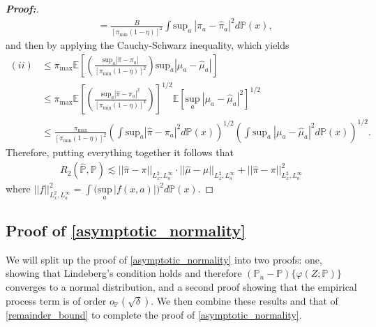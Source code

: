 \documentclass[11pt,twoside]{article}
\theoremstyle{definition}
\theoremstyle{remark}
\begin{document}
\begin{proof}[\textbf{Proof:}]
\begin{align*}
    &= \frac{B}{[\pi_{\min}(1-\eta)]^2}  \int  \text{sup}_a \  | \pi_a - \widehat{\pi}_a |^2  d \mathbb{P}(x),
\end{align*}
and then by applying the Cauchy-Schwarz inequality, which yields
\begin{align*}
    (ii) &\leq \pi_{\max}  \mathbb{E} \left[\left(\frac{\text{sup}_a | \widehat{\pi} - \pi_a| }{[\pi_{\min}(1-\eta)]^2} \right) \text{sup}_a | \mu_a - \widehat{\mu}_a|   \right] \\
    &\leq \pi_{\max}  \mathbb{E} \left[\left(\frac{\text{sup}_a | \widehat{\pi} - \pi_a|^2 }{[\pi_{\min}(1-\eta)]^4} \right) \right]^{1/2} \mathbb{E} \left[\underset{a}{\text{sup}} \ |\mu_a - \widehat{\mu}_a|^2   \right]^{1/2} \\
    &\leq \frac{\pi_{\max}}{[\pi_{\min}(1-\eta)]^2}  \left( \int \text{sup}_a | \widehat{\pi} - \pi_a|^2 d\mathbb{P}(x) \right)^{1/2} \left( \int \text{sup}_a \ |\mu_a - \widehat{\mu}_a|^2  d \mathbb{P}(x) \right)^{1/2}.
\end{align*}
Therefore, putting everything together it follows that
\begin{align*}
        R_2(\widehat{\mathbb{P}}, \mathbb{P}) \lesssim  || \widehat{\pi} - \pi||_{L^2_x, L^\infty_a} \cdot   || \widehat{\mu} - \mu ||_{L^2_x, L^\infty_a}  +  || \widehat{\pi} - \pi||^2_{L^2_x, L^\infty_a}
    \end{align*}
    where $||f||^2_{L^2_x, L^\infty_a} =  \int \big( \underset{a}{\text{sup}} \, |f(x, a) | \big)^2 d \mathbb{P}(x)$.
\end{proof}

\subsection{Proof of \texorpdfstring{\cref{asymptotic_normality}}{Theorem 4}} \label{asymptotic_normality_proof}

We will split up the proof of \cref{asymptotic_normality} into two proofs: one, showing that Lindeberg's condition holds and therefore $(\mathbb{P}_n - \mathbb{P})\{\varphi(Z; \mathbb{P})\}$ converges to a normal distribution, and a second proof showing that the empirical process term is of order $o_\mathbb{P}(\sqrt{\delta})$. We then combine these results and that of \cref{remainder_bound} to complete the proof of \cref{asymptotic_normality}.
\end{document}
